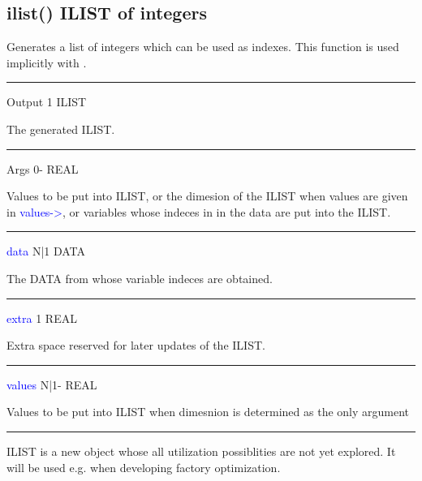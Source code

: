 \subsection{\textcolor{VioletRed}{ilist}() ILIST of integers}
\label{ilist}
Generates a list of integers which can be used as indexes. This function
is used implicitly with {}.
\vspace{0.3cm}
\hrule
\vspace{0.3cm}
\noindent Output \tabto{3cm}  1 \tabto{5cm}   ILIST  \tabto{7cm}
\begin{changemargin}{3cm}{0cm}
\noindent The generated ILIST.
\end{changemargin}
\vspace{0.3cm}
\hrule
\vspace{0.3cm}
\noindent Args \tabto{3cm}  0-  \tabto{5cm}  REAL  \tabto{7cm}
\begin{changemargin}{3cm}{0cm}
\noindent  Values to be put into ILIST, or the dimesion
of the ILIST when values are given in \textcolor{blue}{values->},  or variables whose indeces
in in the data are put into the ILIST.
\end{changemargin}
\vspace{0.3cm}
\hrule
\vspace{0.3cm}
\noindent \textcolor{blue}{data} \tabto{3cm} N|1 \tabto{5cm}   DATA \tabto{7cm}
\begin{changemargin}{3cm}{0cm}
\noindent  The DATA from whose variable indeces are obtained.
\end{changemargin}
\vspace{0.3cm}
\hrule
\vspace{0.3cm}
\noindent \textcolor{blue}{extra}  \tabto{3cm}  1 \tabto{5cm}  REAL  \tabto{7cm}
\begin{changemargin}{3cm}{0cm}
\noindent  Extra space reserved for later updates of the ILIST.
\end{changemargin}
\vspace{0.3cm}
\hrule
\vspace{0.3cm}
\noindent \textcolor{blue}{values}  \tabto{3cm} N|1- \tabto{5cm}   REAL \tabto{7cm}
\begin{changemargin}{3cm}{0cm}
\noindent  Values to be put into ILIST when dimesnion is determined as the
only argument
\end {changemargin}
\hrule
\vspace{0.2cm}
\begin{note}
ILIST is a new object whose all utilization possiblities are not yet explored.
It will be used e.g. when developing factory optimization.
\end{note}
